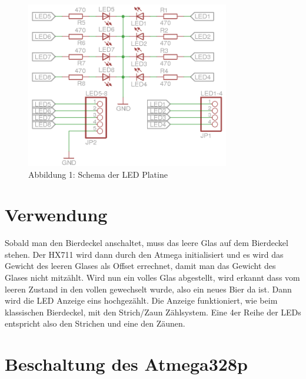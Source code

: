 \documentclass[12pt,journal,compsoc]{IEEEtran}
\begin{document}
%
%
\begin{figure}[!t]
  \centering
    \includegraphics[width=3.5in]{images/LED_Platine_Schema_complete.png}
    \caption{Abbildung 1: Schema der LED Platine}
  \label{fig_led_platine}
\end{figure}

\section{Verwendung}

Sobald man den Bierdeckel anschaltet, muss das leere Glas auf dem Bierdeckel stehen.
Der HX711 wird dann durch den Atmega initialisiert und es wird das Gewicht des leeren Glases
als Offset errechnet, damit man das Gewicht des Glases nicht mitzählt. Wird nun ein volles Glas
abgestellt, wird erkannt dass vom leeren Zustand in den vollen gewechselt wurde, also ein neues
Bier da ist. Dann wird die LED Anzeige eins hochgezählt. Die Anzeige funktioniert,
wie beim klassischen Bierdeckel, mit den Strich/Zaun Zählsystem. Eine 4er Reihe der LEDs
entspricht also den Strichen und eine den Zäunen.

\section{Beschaltung des Atmega328p}
\end{document}
